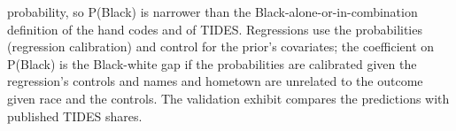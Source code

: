 {probability, so P(Black) is narrower than the Black-alone-or-in-combination definition of the hand codes and of TIDES. Regressions use the probabilities (regression calibration) and control for the prior's covariates; the coefficient on P(Black) is the Black-white gap if the probabilities are calibrated given the regression's controls and names and hometown are unrelated to the outcome given race and the controls. The validation exhibit compares the predictions with published TIDES shares.
\par}

